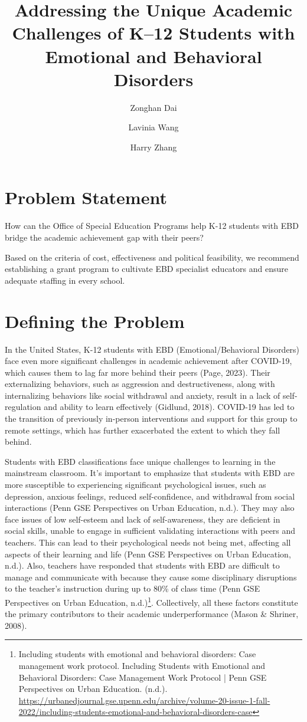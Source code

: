 \documentclass[11pt]{article}
\title{Addressing the Unique Academic Challenges of K--12 Students with Emotional and Behavioral Disorders}
\author{Zonghan Dai}
\author{Lavinia Wang}
\author{\authorstack{Jiadi He}}
\author{Harry Zhang}
\begin{document}
\maketitle
\keywordsline

\section{Problem Statement}

How can the Office of Special Education Programs help K-12 students with EBD bridge the academic achievement gap with their peers?

Based on the criteria of cost, effectiveness and political feasibility, we recommend establishing a grant program to cultivate EBD specialist educators and ensure adequate staffing in every school.

\section{Defining the Problem}

In the United States, K-12 students with EBD (Emotional/Behavioral Disorders) face even more significant challenges in academic achievement after COVID-19, which causes them to lag far more behind their peers (Page, 2023). Their externalizing behaviors, such as aggression and destructiveness, along with internalizing behaviors like social withdrawal and anxiety, result in a lack of self-regulation and ability to learn effectively (Gidlund, 2018). COVID-19 has led to the transition of previously in-person interventions and support for this group to remote settings, which has further exacerbated the extent to which they fall behind.

Students with EBD classifications face unique challenges to learning in the mainstream classroom. It's important to emphasize that students with EBD are more susceptible to experiencing significant psychological issues, such as depression, anxious feelings, reduced self-confidence, and withdrawal from social interactions (Penn GSE Perspectives on Urban Education, n.d.). They may also face issues of low self-esteem and lack of self-awareness, they are deficient in social skills, unable to engage in sufficient validating interactions with peers and teachers. This can lead to their psychological needs not being met, affecting all aspects of their learning and life (Penn GSE Perspectives on Urban Education, n.d.). Also, teachers have responded that students with EBD are difficult to manage and communicate with because they cause some disciplinary disruptions to the teacher's instruction during up to 80\% of class time (Penn GSE Perspectives on Urban Education, n.d.)\footnote{Including students with emotional and behavioral disorders: Case management work protocol. Including Students with Emotional and Behavioral Disorders: Case Management Work Protocol | Penn GSE Perspectives on Urban Education. (n.d.). \url{https://urbanedjournal.gse.upenn.edu/archive/volume-20-issue-1-fall-2022/including-students-emotional-and-behavioral-disorders-case}}. Collectively, all these factors constitute the primary contributors to their academic underperformance (Mason \& Shriner, 2008).
\end{document}
